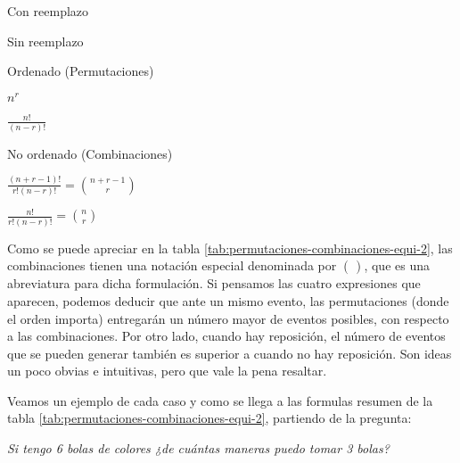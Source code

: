 \documentclass[]{article}
\begin{document}
Con reemplazo

Sin reemplazo

Ordenado (Permutaciones)

\(n^r\)

\(\frac{n!}{(n-r)!}\)

No ordenado (Combinaciones)

\(\frac{(n + r - 1)!}{r!(n-r)!} = \binom{n + r - 1}{r}\)

\(\frac{n!}{r!(n-r)!} = \binom{n}{r}\)

Como se puede apreciar en la tabla
\ref{tab:permutaciones-combinaciones-equi-2}, las combinaciones tienen
una notación especial denominada por \(\binom{}{}\), que es una
abreviatura para dicha formulación. Si pensamos las cuatro expresiones
que aparecen, podemos deducir que ante un mismo evento, las
permutaciones (donde el orden importa) entregarán un número mayor de
eventos posibles, con respecto a las combinaciones. Por otro lado,
cuando hay reposición, el número de eventos que se pueden generar
también es superior a cuando no hay reposición. Son ideas un poco obvias
e intuitivas, pero que vale la pena resaltar.

Veamos un ejemplo de cada caso y como se llega a las formulas resumen de
la tabla \ref{tab:permutaciones-combinaciones-equi-2}, partiendo de la
pregunta:

\emph{Si tengo 6 bolas de colores ¿de cuántas maneras puedo tomar 3
bolas?}
\end{document}
